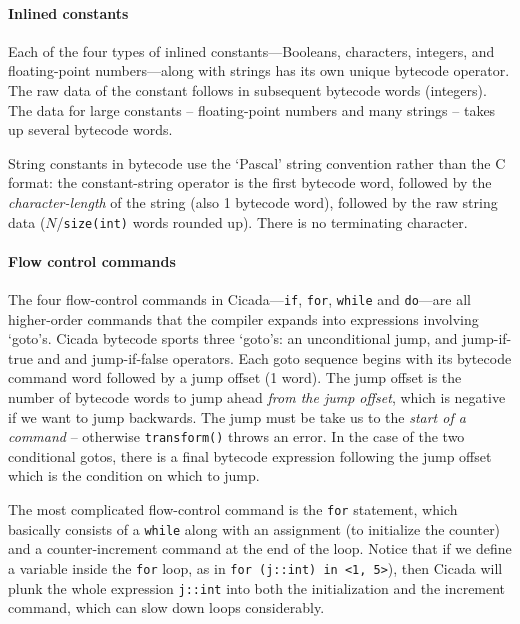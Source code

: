 \documentclass{article}
\begin{document}
\paragraph{Inlined constants}

Each of the four types of inlined constants---Booleans, characters, integers, and floating-point numbers---along with strings has its own unique bytecode operator.  The raw data of the constant follows in subsequent bytecode words (integers).  The data for large constants -- floating-point numbers and many strings -- takes up several bytecode words.

String constants in bytecode use the `Pascal' string convention rather than the C format:  the constant-string operator is the first bytecode word, followed by the \emph{character-length} of the string (also 1 bytecode word), followed by the raw string data ($N$/\verb#size(int)# words rounded up).  There is no terminating character.



\paragraph{Flow control commands}

The four flow-control commands in Cicada---\verb#if#, \verb#for#, \verb#while# and \verb#do#---are all higher-order commands that the compiler expands into expressions involving `goto's.  Cicada bytecode sports three `goto's:  an unconditional jump, and jump-if-true and and jump-if-false operators.  Each goto sequence begins with its bytecode command word followed by a jump offset (1 word).  The jump offset is the number of bytecode words to jump ahead \emph{from the jump offset}, which is negative if we want to jump backwards.  The jump must be take us to the \emph{start of a command} -- otherwise \verb#transform()# throws an error.  In the case of the two conditional gotos, there is a final bytecode expression following the jump offset which is the condition on which to jump.

The most complicated flow-control command is the \verb#for# statement, which basically consists of a \verb#while# along with an assignment (to initialize the counter) and a counter-increment command at the end of the loop.  Notice that if we define a variable inside the \verb#for# loop, as in \verb#for (j::int) in <1, 5>#), then Cicada will plunk the whole expression \verb#j::int# into both the initialization and the increment command, which can slow down loops considerably.
\end{document}
